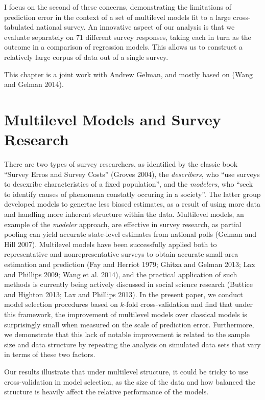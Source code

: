 I focus on the second of these concerns, demonstrating the limitations
of prediction error in the context of a set of multilevel models fit to
a large cross-tabulated national survey. An innovative aspect of our
analysis is that we evaluate separately on 71 different survey
responses, taking each in turn as the outcome in a comparison of
regression models. This allows us to construct a relatively large corpus
of data out of a single survey.

This chapter is a joint work with Andrew Gelman, and mostly based on
(Wang and Gelman 2014).

\section{Multilevel Models and Survey
Research}\label{multilevel-models-and-survey-research}

There are two types of survey researchers, as identified by the classic
book ``Survey Erros and Survey Costs'' (Groves 2004), the
\emph{describers}, who ``use surveys to descxribe characteristics of a
fixed population'', and the \emph{modelers}, who ``seek to identify
causes of phenomena constatly occuring in a society''. The latter group
developed models to genertae less biased estimates, as a result of using
more data and handling more inherent structure within the data.
Multilevel models, an example of the \emph{modeler} approach, are
effective in survey research, as partial pooling can yield accurate
state-level estimates from national polls (Gelman and Hill 2007).
Multilevel models have been successfully applied both to representative
and nonrepresentative surveys to obtain accurate small-area estimation
and prediction (Fay and Herriot 1979; Ghitza and Gelman 2013; Lax and
Phillips 2009; Wang et al. 2014), and the practical application of such
methods is currently being actively discussed in social science research
(Buttice and Highton 2013; Lax and Phillips 2013). In the present paper,
we conduct model selection procedures based on \(k\)-fold
cross-validation and find that under this framework, the improvement of
multilevel models over classical models is surprisingly small when
measured on the scale of prediction error. Furthermore, we demonstrate
that this lack of notable improvement is related to the sample size and
data structure by repeating the analysis on simulated data sets that
vary in terms of these two factors.

Our results illustrate that under multilevel structure, it could be
tricky to use cross-validation in model selection, as the size of the
data and how balanced the structure is heavily affect the relative
performance of the models.

